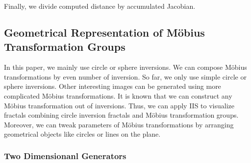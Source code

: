 Finally, we divide computed distance by accumulated Jacobian.


\subsection{Geometrical Representation of M\"obius Transformation Groups}


In this paper, we mainly use circle or sphere inversions.
We can compose M\"obius transformations by even number of
inversion.
So far, we only use simple circle or sphere inversions.
Other interesting images can be generated using more
complicated M\"obius transformations.
It is known that we can construct any M\"obius transformation out of
inversions.
Thus, we can apply IIS to visualize fractals combining circle inversion
fractals and M\"obius transformation groups.
Moreover, we can tweak parameters of M\"obius transformations by
arranging geometrical objects like circles or lines on the plane.

\subsubsection{Two Dimensionanl Generators}

